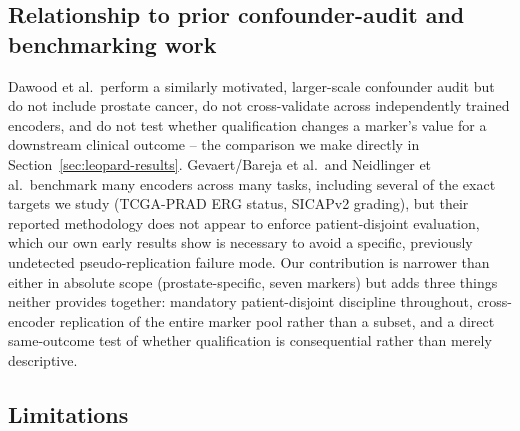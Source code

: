 \label{sec:limitations}

\subsection{Relationship to prior confounder-audit and benchmarking work}

Dawood et al.\ perform a similarly motivated, larger-scale confounder audit but do not include
prostate cancer, do not cross-validate across independently trained encoders, and do not test
whether qualification changes a marker's value for a downstream clinical outcome -- the
comparison we make directly in Section~\ref{sec:leopard-results}. Gevaert/Bareja et al.\ and
Neidlinger et al.\ benchmark many encoders across many tasks, including several of the exact
targets we study (TCGA-PRAD ERG status, SICAPv2 grading), but their reported methodology does
not appear to enforce patient-disjoint evaluation, which our own early results show is
necessary to avoid a specific, previously undetected pseudo-replication failure mode. Our
contribution is narrower than either in absolute scope (prostate-specific, seven markers) but
adds three things neither provides together: mandatory patient-disjoint discipline throughout,
cross-encoder replication of the entire marker pool rather than a subset, and a direct
same-outcome test of whether qualification is consequential rather than merely descriptive.

\subsection{Limitations}

